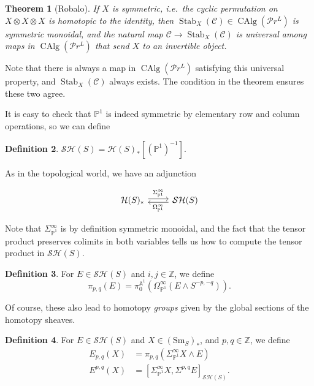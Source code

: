 \documentclass{shortart}
\newtheorem{thm}{Theorem}[section]
\theoremstyle{definition}
\newtheorem{defi}[thm]{Definition}
\newcommand\Sm{\mathrm{Sm}}
\newcommand\SH{\mathcal{SH}}
\renewcommand\H{\mathcal{H}}
\renewcommand\P{\mathbb{P}}
\newcommand\A{\mathbb{A}}
\newcommand\Z{\mathbb{Z}}
\newcommand\PrL{\mathcal{P}r^L}
\DeclareMathOperator\CAlg{CAlg}
\DeclareMathOperator\Stab{Stab}
\begin{document}
\begin{thm}[Robalo]
  If $X$ is \emph{symmetric}, i.e.\ the cyclic permutation on $X \otimes X \otimes X$ is homotopic to the identity, then $\Stab_X(\mathcal{C}) \in \CAlg(\PrL)$ is symmetric monoidal, and the natural map $\mathcal{C} \to \Stab_X(\mathcal{C})$ is universal among maps in $\CAlg(\PrL)$ that send $X$ to an invertible object.
\end{thm}

Note that there is always a map in $\CAlg(\PrL)$ satisfying this universal property, and $\Stab_X(\mathcal{C})$ always exists. The condition in the theorem ensures these two agree.

It is easy to check that $\P^1$ is indeed symmetric by elementary row and column operations, so we can define
\begin{defi}
  $\SH(S) = \H(S)_*[(\P^1)^{-1}]$.
\end{defi}

As in the topological world, we have an adjunction
\begin{useimager}
  \[
    \begin{tikzcd}
      \H(S)_* \ar[r, yshift = 2, "\Sigma^\infty_{\P^1}"] & \SH(S) \ar[l, yshift=-2, "\Omega^\infty_{\P^1}"]
    \end{tikzcd}
  \]
\end{useimager}

Note that $\Sigma^\infty_{\P^1}$ is by definition symmetric monoidal, and the fact that the tensor product preserves colimits in both variables tells us how to compute the tensor product in $\SH(S)$.

\begin{defi}
  For $E \in \SH(S)$ and $i, j \in \Z$, we define
  \[
    \pi_{p, q}(E) = \pi_0^{\A^1}(\Omega^\infty_{\P^1}(E \wedge S^{-p, -q})).
  \]
\end{defi}

Of course, these also lead to homotopy \emph{groups} given by the global sections of the homotopy sheaves.

\begin{defi}
  For $E \in \SH(S)$ and $X \in (\Sm_S)_*$, and $p, q \in \Z$, we define
  \[
    \begin{aligned}
      E_{p, q}(X) &= \pi_{p, q}(\Sigma^\infty_{\P^1} X \wedge E)\\
      E^{p, q}(X) &= [\Sigma^\infty_{\P^1} X, \Sigma^{p, q} E]_{\SH(S)}.
    \end{aligned}
  \]
\end{defi}
\end{document}
